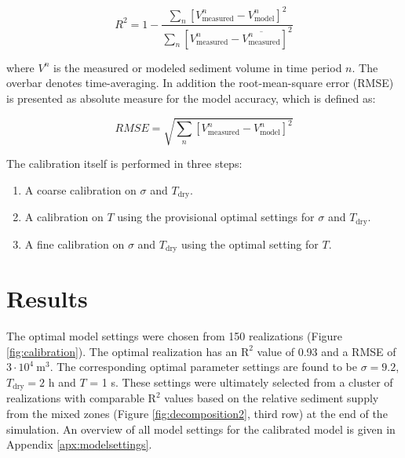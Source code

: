 \documentclass[preprint,12pt,authoryear]{elsarticle}
\begin{document}
\begin{equation}
  \label{eq:r2}
  R^2 = 1 - \frac{\sum_n \left[ V^n_{\mathrm{measured}} - V^n_{\mathrm{model}} \right]^2}{\sum_n \left[ V^n_{\mathrm{measured}} - \overline{V^n_{\mathrm{measured}}} \right]^2}
\end{equation}

\noindent where $V^n$ is the measured or modeled sediment volume in
time period $n$. The overbar denotes time-averaging. In addition the
root-mean-square error (RMSE) is presented as absolute measure for the
model accuracy, which is defined as:

\begin{equation}
  \label{eq:rmse}
  RMSE = \sqrt{\sum_n \left[ V^n_{\mathrm{measured}} - V^n_{\mathrm{model}} \right]^2}
\end{equation}

\noindent The calibration itself is performed in three steps:

\begin{enumerate}
\item A coarse calibration on $\sigma$ and $T_{\mathrm{dry}}$.
\item A calibration on $T$ using the provisional optimal settings for
  $\sigma$ and $T_{\mathrm{dry}}$.
\item A fine calibration on $\sigma$ and $T_{\mathrm{dry}}$ using the
  optimal setting for $T$.
\end{enumerate}

\section{Results}

The optimal model settings were chosen from 150 realizations (Figure
\ref{fig:calibration}). The optimal realization has an $\mathrm{R^2}$
value of 0.93 and a RMSE of $3 \cdot 10^4 ~ \mathrm{m^3}$.
The corresponding optimal parameter settings are found to be
$\sigma = 9.2$, $T_{\mathrm{dry}} = 2$ h and $T$ = 1 s. These
settings were ultimately selected from a cluster of realizations with
comparable $\mathrm{R^2}$ values based on the relative sediment supply
from the mixed zones (Figure \ref{fig:decomposition2}, third row) at
the end of the simulation. An overview of all model settings for the
calibrated model is given in Appendix \ref{apx:modelsettings}.
\end{document}
